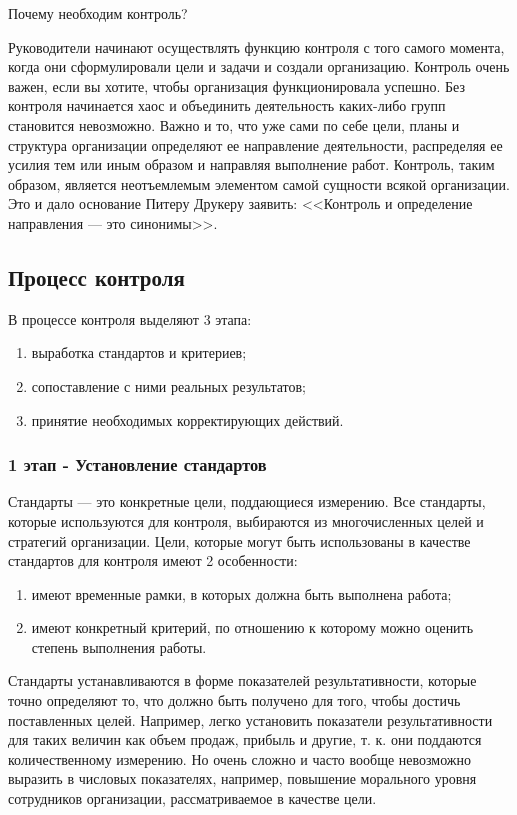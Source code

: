 \documentclass[a4paper,12pt,oneside,final]{extarticle}
\numberwithin{equation}{section}
\begin{document}
Почему необходим контроль?

Руководители начинают осуществлять функцию контроля с того самого момента, когда они сформулировали цели и задачи и создали организацию. 
Контроль очень важен, если вы хотите, чтобы организация функционировала успешно. 
Без контроля начинается хаос и объединить деятельность каких-либо групп становится невозможно. 
Важно и то, что уже сами по себе цели, планы и структура организации определяют ее направление деятельности, распределяя ее усилия тем или иным образом и направляя выполнение работ. Контроль, таким образом, является неотъемлемым элементом самой сущности всякой организации. 
Это и дало основание Питеру Друкеру заявить: <<Контроль и определение направления --- это синонимы>>.

\subsection{Процесс контроля}
В процессе контроля выделяют 3 этапа:
\begin{enumerate}
	\item выработка стандартов и критериев;
	\item сопоставление с ними реальных результатов;
	\item принятие необходимых корректирующих действий.
\end{enumerate}

\subsubsection{1 этап - Установление стандартов}
Стандарты --- это конкретные цели, поддающиеся измерению. 
Все стандарты, которые используются для контроля, выбираются из многочисленных целей и стратегий организации.
Цели, которые могут быть использованы в качестве стандартов для контроля имеют 2 особенности:
\begin{enumerate}
	\item имеют временные рамки, в которых должна быть выполнена работа;
	\item имеют конкретный критерий, по отношению к которому можно оценить степень выполнения работы.
\end{enumerate}

Стандарты устанавливаются в форме показателей результативности, которые точно определяют то, что должно быть получено для того, чтобы достичь поставленных целей. Например, легко установить показатели результативности для таких величин как объем продаж, прибыль и другие, т. к. они поддаются количественному измерению. 
Но очень сложно и часто вообще невозможно выразить в числовых показателях, например, повышение морального уровня сотрудников организации, рассматриваемое в качестве цели.
\end{document}
